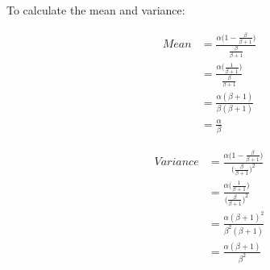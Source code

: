 To calculate the mean and variance:

\begin{align*}
Mean &= \frac{\alpha\bigg(1-\frac{\beta}{\beta+1}\bigg)}{\frac{\beta}{\beta+1}}\\
&= \frac{\alpha\bigg (\frac{1}{\beta+1}\bigg)}{\frac{\beta}{\beta+1}}\\
&= \frac{\alpha(\beta+1)}{\beta(\beta+1)}\\
&= \frac{\alpha}{\beta}
\end{align*}

\begin{align*}
Variance &= \frac{\alpha\bigg(1-\frac{\beta}{\beta+1}\bigg)}{\bigg(\frac{\beta}{\beta+1}\bigg)^2}\\
&= \frac{\alpha\bigg (\frac{1}{\beta+1}\bigg)}{\bigg(\frac{\beta}{\beta+1}\bigg)^2}\\
&= \frac{\alpha(\beta+1)^2}{\beta^2(\beta+1)}\\
&= \frac{\alpha(\beta+1)}{\beta^2}
\end{align*}




